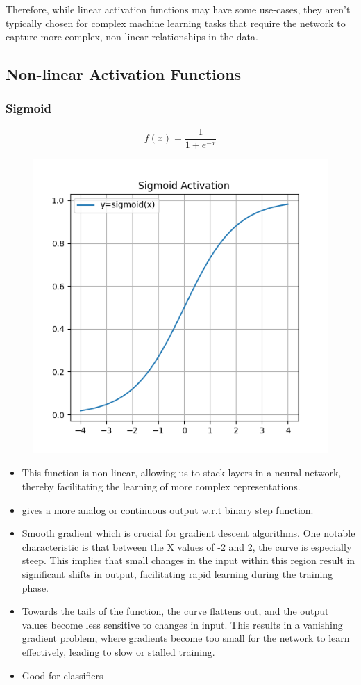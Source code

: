 \documentclass[11pt]{article}
\begin{document}
Therefore, while linear activation functions may have some use-cases, they aren't typically chosen for complex machine learning tasks that require the network to capture more complex, non-linear relationships in the data. 

\subsection{Non-linear Activation Functions}

\subsubsection{Sigmoid}

\begin{definition}\label{eq:activation-sigmoid}
    \begin{equation*}
        f(x) = \frac{1}{1+e^{-x}}
    \end{equation*}
\end{definition}

\begin{figure}[H]
    \centering
    \includegraphics*[width=.4\linewidth]{figures/Sigmoid Activation.png}\label{fig:sigmoid}
\end{figure}

\begin{itemize}
    \item This function is non-linear, allowing us to stack layers in a neural network, thereby facilitating the learning of more complex representations. 
    \item gives a more analog or continuous output w.r.t binary step function.
    \item Smooth gradient which is crucial for gradient descent algorithms. One notable characteristic is that between the X values of -2 and 2, the curve is especially steep. This implies that small changes in the input within this region result in significant shifts in output, facilitating rapid learning during the training phase.
    \item Towards the tails of the function, the curve flattens out, and the output values become less sensitive to changes in input. This results in a vanishing gradient problem, where gradients become too small for the network to learn effectively, leading to slow or stalled training. 
    \item Good for classifiers
\end{itemize}
\end{document}
